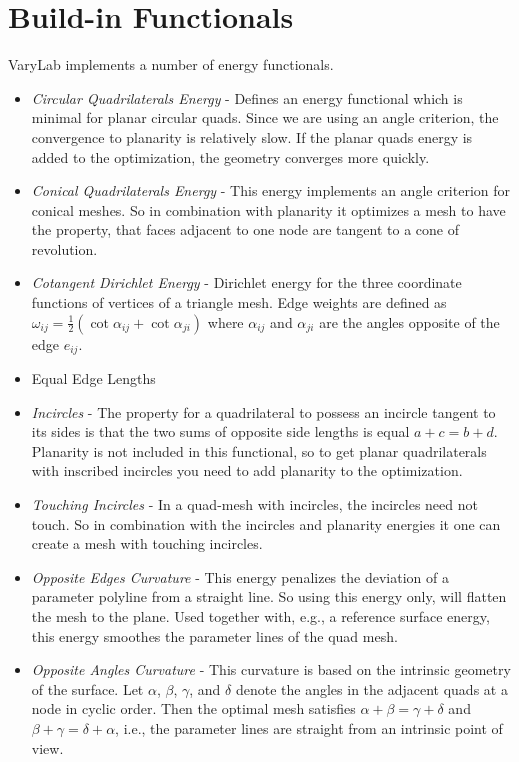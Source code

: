 \documentclass[Thesis.tex]{subfiles}
\begin{document}
\section{Build-in Functionals}

{\sc VaryLab} implements a number of energy functionals.

\begin{itemize}
\item \emph{Circular Quadrilaterals Energy} - Defines an energy functional which is minimal for planar circular quads. Since we are using an angle criterion, the convergence to planarity is relatively slow. If the planar quads energy is added to the optimization, the geometry converges more quickly.
\item \emph{Conical Quadrilaterals Energy} - This energy implements an angle criterion for conical meshes. So in combination with planarity it optimizes a mesh to have the property, that faces adjacent to one node are tangent to a cone of revolution.
\item \emph{Cotangent Dirichlet Energy} - Dirichlet energy for the three coordinate functions of vertices of a triangle mesh. Edge weights are defined as $\omega_\mathit{ij}=\frac{1}{2}(\cot\alpha_\mathit{ij}+\cot\alpha_\mathit{ji})$ where $\alpha_\mathit{ij}$ and $\alpha_\mathit{ji}$ are the angles opposite of the edge $e_\mathit{ij}$.
\item Equal Edge Lengths
\item \emph{Incircles} - The property for a quadrilateral to possess an incircle tangent to its sides is that the two sums of opposite side lengths is equal $a+c=b+d$. Planarity is not included in this functional, so to get planar quadrilaterals with inscribed incircles you need to add planarity to the optimization.
\item \emph{Touching Incircles} - In a quad-mesh with incircles, the incircles need not touch. So in combination with the incircles and planarity energies it one can create a mesh with touching incircles.
\item \emph{Opposite Edges Curvature} - This energy penalizes the deviation of a parameter polyline from a straight line. So using this energy only, will flatten the mesh to the plane. Used together with, e.g., a reference surface energy, this energy smoothes the  parameter lines of the quad mesh.
\item \emph{Opposite Angles Curvature} - This curvature is based on the intrinsic geometry of the surface. Let $\alpha$, $\beta$, $\gamma$, and $\delta$ denote the angles in the adjacent quads at a node in cyclic order. Then the optimal mesh satisfies $\alpha+\beta=\gamma+\delta$ and $\beta+\gamma=\delta+\alpha$, i.e., the parameter lines are straight from an intrinsic point of view.

\end{itemize}
\end{document}
